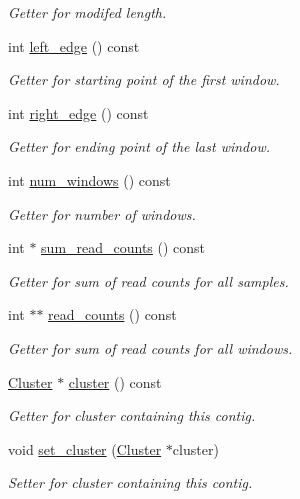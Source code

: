 \begin{DoxyCompactItemize}
\begin{DoxyCompactList}\small\item\em Getter for modifed length. \item\end{DoxyCompactList}\item 
int \hyperlink{classContig_a6ce973add14cd9ad93d3911dbd2cd6e9}{left\_\-edge} () const 
\begin{DoxyCompactList}\small\item\em Getter for starting point of the first window. \item\end{DoxyCompactList}\item 
int \hyperlink{classContig_afcc79b673b2e617997a2abbc543dbd05}{right\_\-edge} () const 
\begin{DoxyCompactList}\small\item\em Getter for ending point of the last window. \item\end{DoxyCompactList}\item 
int \hyperlink{classContig_a8401c01f72a0d890894feec48e397511}{num\_\-windows} () const 
\begin{DoxyCompactList}\small\item\em Getter for number of windows. \item\end{DoxyCompactList}\item 
int $\ast$ \hyperlink{classContig_abaae9169895892b8f5f64d45ff9e83d2}{sum\_\-read\_\-counts} () const 
\begin{DoxyCompactList}\small\item\em Getter for sum of read counts for all samples. \item\end{DoxyCompactList}\item 
int $\ast$$\ast$ \hyperlink{classContig_aea68c04bfd7422be6e11fa6f8ca12804}{read\_\-counts} () const 
\begin{DoxyCompactList}\small\item\em Getter for sum of read counts for all windows. \item\end{DoxyCompactList}\item 
\hyperlink{classCluster}{Cluster} $\ast$ \hyperlink{classContig_aff0179a2d1010e85316f6f842fe01ae2}{cluster} () const 
\begin{DoxyCompactList}\small\item\em Getter for cluster containing this contig. \item\end{DoxyCompactList}\item 
void \hyperlink{classContig_af3467f4ccb8e5db1eb86c96d40f38421}{set\_\-cluster} (\hyperlink{classCluster}{Cluster} $\ast$cluster)
\begin{DoxyCompactList}\small\item\em Setter for cluster containing this contig. \item\end{DoxyCompactList}\end{DoxyCompactItemize}
